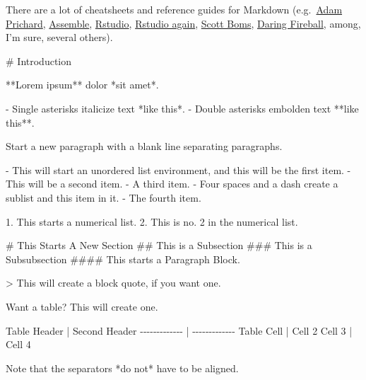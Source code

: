 \documentclass[
  11pt,
]{article}
\newenvironment{Shaded}{\begin{snugshade}}{\end{snugshade}}
\newcommand{\AttributeTok}[1]{\textcolor[rgb]{0.77,0.63,0.00}{#1}}
\newcommand{\FunctionTok}[1]{\textcolor[rgb]{0.00,0.00,0.00}{#1}}
\newcommand{\NormalTok}[1]{#1}
\newcommand{\SpecialStringTok}[1]{\textcolor[rgb]{0.31,0.60,0.02}{#1}}
\begin{document}
There are a lot of cheatsheets and reference guides for Markdown
(e.g.~\href{https://github.com/adam-p/markdown-here/wiki/Markdown-Cheatsheet}{Adam
Prichard},
\href{http://assemble.io/docs/Cheatsheet-Markdown.html}{Assemble},
\href{https://www.rstudio.com/wp-content/uploads/2015/02/rmarkdown-cheatsheet.pdf}{Rstudio},
\href{https://www.rstudio.com/wp-content/uploads/2015/03/rmarkdown-reference.pdf}{Rstudio
again},
\href{http://scottboms.com/downloads/documentation/markdown_cheatsheet.pdf}{Scott
Boms}, \href{https://daringfireball.net/projects/markdown/syntax}{Daring
Fireball}, among, I'm sure, several others).

\begin{Shaded}
\begin{Highlighting}[]
\FunctionTok{\# Introduction}

\NormalTok{**Lorem ipsum** dolor *sit amet*. }

\SpecialStringTok{{-} }\NormalTok{Single asterisks italicize text *like this*. }
\SpecialStringTok{{-} }\NormalTok{Double asterisks embolden text **like this**.}

\NormalTok{Start a new paragraph with a blank line separating paragraphs.}

\SpecialStringTok{{-} }\NormalTok{This will start an unordered list environment, and this will be the first item.}
\SpecialStringTok{{-} }\NormalTok{This will be a second item.}
\SpecialStringTok{{-} }\NormalTok{A third item.}
\SpecialStringTok{    {-} }\NormalTok{Four spaces and a dash create a sublist and this item in it.}
\SpecialStringTok{{-} }\NormalTok{The fourth item.}
    
\SpecialStringTok{1. }\NormalTok{This starts a numerical list.}
\SpecialStringTok{2. }\NormalTok{This is no. 2 in the numerical list.}
    
\FunctionTok{\# This Starts A New Section}
\FunctionTok{\#\# This is a Subsection}
\FunctionTok{\#\#\# This is a Subsubsection}
\FunctionTok{\#\#\#\# This starts a Paragraph Block.}

\AttributeTok{\textgreater{} This will create a block quote, if you want one.}

\NormalTok{Want a table? This will create one.}

\NormalTok{Table Header  | Second Header}
\NormalTok{{-}{-}{-}{-}{-}{-}{-}{-}{-}{-}{-}{-}{-} | {-}{-}{-}{-}{-}{-}{-}{-}{-}{-}{-}{-}{-}}
\NormalTok{Table Cell    | Cell 2}
\NormalTok{Cell 3        | Cell 4 }

\NormalTok{Note that the separators *do not* have to be aligned.}


\end{Highlighting}
\end{Shaded}
\end{document}
